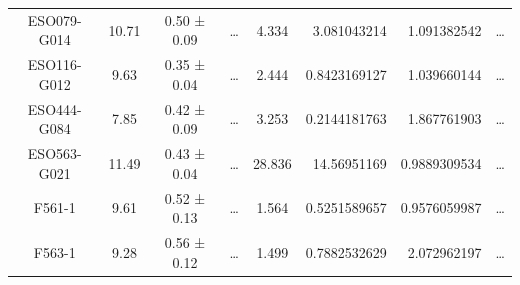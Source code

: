 \documentclass[reprint,%
 amsmath,amssymb,
 aps,
]{revtex4-1}
\begin{document}
\begin{table}[]
\begin{tabular}{cccccrrc}
\rowcolor[HTML]{F3F3F3} 
ESO079-G014          & 10.71                     & 0.50 ± 0.09           & …                      & 4.334                                                        & 3.081043214                                                           & 1.091382542                                                           & …                                                             \\
\rowcolor[HTML]{F3F3F3} 
ESO116-G012          & 9.63                      & 0.35 ± 0.04           & …                      & 2.444                                                        & 0.8423169127                                                          & 1.039660144                                                           & …                                                             \\
\rowcolor[HTML]{F3F3F3} 
ESO444-G084          & 7.85                      & 0.42 ± 0.09           & …                      & 3.253                                                        & 0.2144181763                                                          & 1.867761903                                                           & …                                                             \\
\rowcolor[HTML]{F3F3F3} 
ESO563-G021          & 11.49                     & 0.43 ± 0.04           & …                      & 28.836                                                       & 14.56951169                                                           & 0.9889309534                                                          & …                                                             \\
\rowcolor[HTML]{F3F3F3} 
F561-1               & 9.61                      & 0.52 ± 0.13           & …                      & 1.564                                                        & 0.5251589657                                                          & 0.9576059987                                                          & …                                                             \\
\rowcolor[HTML]{F3F3F3} 
F563-1               & 9.28                      & 0.56 ± 0.12           & …                      & 1.499                                                        & 0.7882532629                                                          & 2.072962197                                                           & …                                                             \\

\end{tabular}
\end{table}
\end{document}

